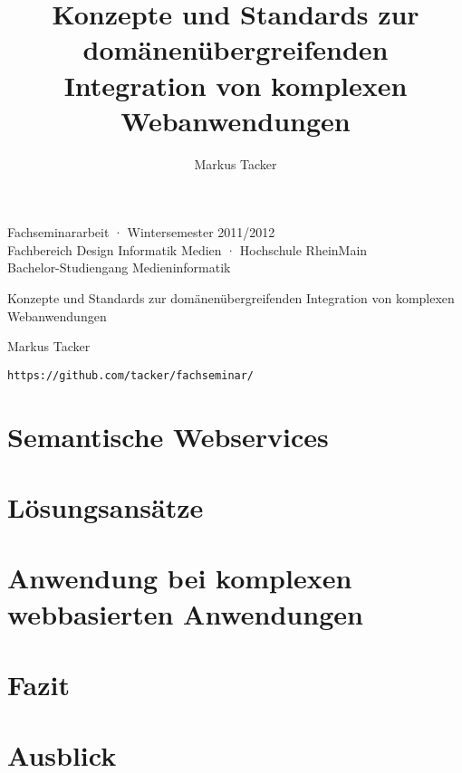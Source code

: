 \documentclass[10pt,a4paper]{article}
\begin{document}
\author{Markus Tacker}
\title{Konzepte und Standards zur domänenübergreifenden Integration von komplexen Webanwendungen}

\begin{center}

\begin{small}Fachseminararbeit · Wintersemester 2011/2012\\Fachbereich Design Informatik Medien · Hochschule RheinMain\\Bachelor-Studiengang Medieninformatik\end{small}

\bigskip

\begin{huge}Konzepte und Standards 
\medskip
zur domänenübergreifenden Integration
\medskip
von komplexen Webanwendungen\end{huge}

\bigskip

\begin{large}Markus Tacker\end{large}

\begin{small}\texttt{https://github.com/tacker/fachseminar/}\end{small}

\end{center}



\pagebreak

\tableofcontents



\section{Semantische Webservices}
\label{l:sem-web-ser}


\section{Lösungsansätze}
\label{l:loesungen}
% 

\section{Anwendung bei komplexen webbasierten Anwendungen}
\label{l:verwendung}
% 

\section{Fazit}
\label{l:fazit}
% 

\section{Ausblick}
\label{l:ausblick}
% 

\pagebreak


\end{document}
